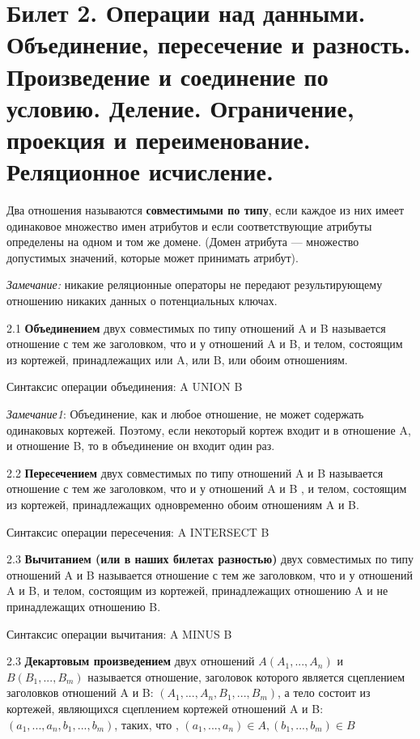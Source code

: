 \newpage
\section{Билет 2. Операции над данными. Объединение, пересечение и разность. Произведение и соединение по условию. Деление. Ограничение, проекция и переименование. Реляционное исчисление.}

Два отношения называются  \textbf{совместимыми по типу}, если каждое из них имеет одинаковое множество имен атрибутов и если соответствующие атрибуты определены на одном и том же домене. 
(Домен атрибута — множество допустимых значений, которые может принимать атрибут). 

\textit{Замечание:} никакие реляционные операторы не передают результирующему отношению никаких данных о потенциальных ключах.

2.1 \textbf{Объединением} двух совместимых по типу отношений A и B называется отношение с тем же заголовком, что и у отношений A и B, и телом, состоящим из кортежей, принадлежащих или A, или B, или обоим отношениям.

Синтаксис операции объединения: A UNION B

\textit{Замечание1}: Объединение, как и любое отношение, не может содержать одинаковых кортежей. Поэтому, если некоторый кортеж входит и в отношение A, и отношение B, то в объединение он входит один раз.

2.2 \textbf{Пересечением} двух совместимых по типу отношений A и B называется отношение с тем же заголовком, что и у отношений A и B , и телом, состоящим из кортежей, принадлежащих одновременно обоим отношениям A и B.

Синтаксис операции пересечения: A INTERSECT B

2.3 \textbf{Вычитанием (или в наших билетах разностью)} двух совместимых по типу отношений A и B называется отношение с тем же заголовком, что и у отношений A и B, и телом, состоящим из кортежей, принадлежащих отношению A и не принадлежащих отношению B. 

Синтаксис операции вычитания: A MINUS B


2.3  \textbf{Декартовым произведением} двух отношений $A(A_1, ..., A_n)$ и $B(B_1,..., B_m)$ называется отношение, заголовок которого является сцеплением заголовков отношений A и B: $(A_1, ..., A_n, B_1,..., B_m)$,
а тело состоит из кортежей, являющихся сцеплением кортежей отношений A и B: $(a_1, ..., a_n, b_1,..., b_m)$, таких, что , $(a_1, ..., a_n) \in A, (b_1,..., b_m) \in B$


